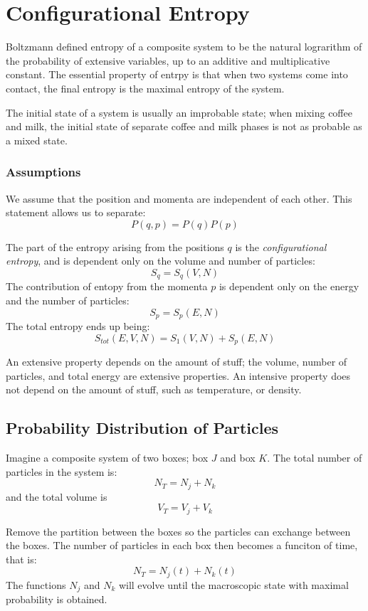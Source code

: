 \chapter{Configurational Entropy}
Boltzmann defined entropy of a composite system to be the natural lograrithm of the probability of extensive variables, up to an additive and multiplicative constant. The essential property of entrpy is that when two systems come into contact, the final entropy is the maximal entropy of the system.

The initial state of a system is usually an improbable state; when mixing coffee and milk, the initial state of separate coffee and milk phases is not as probable as a mixed state.

\subsection{Assumptions}
We assume that the position and momenta are independent of each other. This statement allows us to separate:
\begin{equation}
	P(q,p)=P(q)P(p)
\end{equation}
 
The part of the entropy arising from the positions \(q\) is the \emph{configurational entropy}, and is dependent only on the volume and number of particles:
\[S_q=S_q(V,N)\]
The contribution of entopy from the momenta \(p\) is dependent only on the energy and the number of particles:
\[S_p=S_p(E,N)\]
The total entropy ends up being:
\[S_{tot}(E,V,N)=S_1(V,N)+S_p(E,N)\]

\begin{aside}
An extensive property depends on the amount of stuff; the volume, number of particles, and total energy are extensive properties. An intensive property does not depend on the amount of stuff, such as temperature, or density.
\end{aside}

\section{Probability Distribution of Particles}
Imagine a composite system of two boxes; box \(J\) and box \(K\). The total number of particles in the system is:
\[N_T=N_j+N_k\]
and the total volume is
\[V_T=V_j+V_k\]

Remove the partition between the boxes so the particles can exchange between the boxes. The number of particles in each box then becomes a funciton of time, that is:
\[N_T=N_j(t)+N_k(t)\]
The functions \(N_j\) and \(N_k\) will evolve until the macroscopic state with maximal probability is obtained. 

